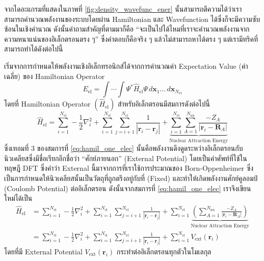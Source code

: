 จากไดอะแกรมที่แสดงในภาพที่ \ref{fig:density_wavefunc_ener} นั้นสามารถตีความได้ว่าเราสามารถคำนวณพลังงานของระบบโดยผ่าน Hamiltonian และ Wavefunction ได้ซึ่งก็จะมีความซับซ้อนในเชิงคำนวณ ดังนั้นคำถามสำคัญที่ตามมาก็คือ \enquote{จะเป็นไปได้ไหมที่เราจะคำนวณพลังงานจากความหนาแน่นของอิเล็กตรอนตรง ๆ} ซึ่งคำตอบก็คือจริง ๆ แล้วไม่สามารถหาได้ตรง ๆ แต่เรามีทริคที่สามารถทำได้ดังต่อไปนี้

เริ่มจากการกำหนดให้พลังงานเชิงอิเล็กทรอนิกส์ได้จากการคำนวณค่า Expectation Value (ค่าเฉลี่ย) ของ Hamiltonian Operator
%
\begin{equation}\label{eq:ener_expect_value}
    E_{\text{el}} = \int \cdots \int \Psi^{\ast} \hat{H}_{\text{el}} \Psi \, d\bm{x}_{1} \dots \,
    d\bm{x}_{N_{\text{el}}}
\end{equation}
%
\noindent โดยที่ Hamiltonian Operator $(\hat{H}_{\text{el}})$ สำหรับอิเล็กตรอนมีสมการดังต่อไปนี้
%
\begin{equation}\label{eq:hamil_one_elec}
    \hat{H}_{\text{el}} = \sum^{N_{\text{el}}}_{i=1} -\frac{1}{2} \nabla^{2}_{i}
    + \sum^{N_{\text{el}}}_{i=1} \sum^{N_{\text{el}}}_{j=i+1} \frac{1}{|\bm{r}_{i}-\bm{r}_{j}|}
    + \underbrace{\sum^{N_{\text{el}}}_{i=1} \sum^{N_{\text{nu}}}_{A=1} \frac{-Z_{A}}{|\bm{r}_{i}-\bm{R}_{A}|}}    _{\text{Nuclear Attraction Energy}}
\end{equation}
%
\noindent ซึ่งเทอมที่ 3 ของสมการที่ \eqref{eq:hamil_one_elec} นั้นคือพลังงานดึงดูดระหว่างอิเล็กตรอนกับนิวเคลียสซึ่งมีชื่อเรียกอีกชื่อว่า \enquote{ศักย์ภายนอก} (External Potential) โดยเป็นคำศัพท์ที่ใช้ในทฤษฎี DFT ซึ่งคำว่า External นี้มาจากการที่เราใช้การประมาณของ Born-Oppenheimer ซึ่งเป็นการกำหนดให้นิวเคลียสนั้นเป็นวัตถุที่ถูกตรึงอยู่กับที่ (Fixed) และทำให้เกิดพลังงานศักย์คูลอมป์ (Coulomb Potential) ต่ออิเล็กตรอน ดังนั้นจากสมการที่ \eqref{eq:hamil_one_elec} เราจึงเขียนใหม่ได้เป็น
%
\begin{align}\label{eq:hamil_ext_pot}
    \hat{H}_{\text{el}} & = \sum^{N_{\text{el}}}_{i=1} -\frac{1}{2} \nabla^{2}_{i}
    + \sum^{N_{\text{el}}}_{i=1} \sum^{N_{\text{el}}}_{j=i+1} \frac{1}{|\bm{r}_{i}-\bm{r}_{j}|}
    + \sum^{N_{\text{el}}}_{i=1}
    \underbrace{\left ( \sum^{N_{\text{nu}}}_{A=1} \frac{-Z_{A}}{|\bm{r}_{i}-\bm{R}_{A}|} \right )}    _{\text{Nuclear Attraction Energy}} \nonumber                                  \\
                        & = \sum^{N_{\text{el}}}_{i=1} -\frac{1}{2} \nabla^{2}_{i}
    + \sum^{N_{\text{el}}}_{i=1} \sum^{N_{\text{el}}}_{j=i+1} \frac{1}{|\bm{r}_{i}-\bm{r}_{j}|}
    + \sum^{N_{\text{el}}}_{i=1} V_{\text{ext}}(\bm{r}_{i})
\end{align}
%
\noindent โดยที่มี External Potential $V_{\text{ext}}(\bm{r}_{i})$ กระทำต่ออิเล็กตรอนทุกตัวในโมเลกุล

